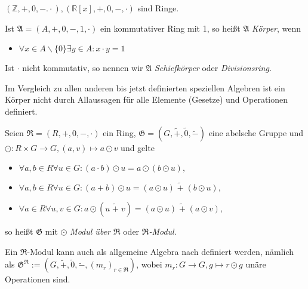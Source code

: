 \begin{example}
    $(\mathbb{Z}, +, 0, -. \cdot), (\mathbb{R}[x], +, 0, -, \cdot)$ sind Ringe.
\end{example}

\begin{samepage}
\begin{definition}
    Ist $\mathfrak{A} = (A,+,0,-,1,\cdot)$ ein kommutativer Ring mit 1, so heißt $\mathfrak{A}$ \emph{Körper}, wenn
    \begin{itemize}
        \item $\forall x \in A\backslash \{0\} \exists y \in A: x\cdot y = 1$
    \end{itemize}
    Ist $\cdot$ nicht kommutativ, so nennen wir $\mathfrak{A}$ \emph{Schiefkörper} oder \emph{Divisionsring}.
\end{definition}
\end{samepage}

\begin{remark}
    Im Vergleich zu allen anderen bis jetzt definierten speziellen Algebren ist ein Körper nicht durch Allaussagen für alle Elemente (Gesetze) und Operationen definiert. 
\end{remark}

\begin{definition}
    Seien $\mathfrak{R} = (R, +, 0, -, \cdot)$ ein Ring, $\mathfrak{G} = (G, \widetilde{+}, \widetilde{0}, \widetilde{-})$ eine abelsche Gruppe und $\odot: R \times G \to G, (a, v) \mapsto a \odot v$ und gelte
    \begin{itemize}
        \item $\forall a,b \in R \forall u \in G: (a \cdot b)\odot u = a \odot (b \odot u),$
        \item $\forall a,b \in R \forall u \in G: (a + b) \odot u = (a \odot u) \;\widetilde{+}\; (b \odot u),$
        \item $\forall a \in R \forall u,v \in G: a \odot (u \;\widetilde{+}\; v) = (a \odot u) \;\widetilde{+}\; (a \odot v),$
    \end{itemize}
    so heißt $\mathfrak{G}$ mit $\odot$ \emph{Modul über $\mathfrak{R}$} oder \emph{$\mathfrak{R}$-Modul}.

    Ein $\mathfrak{R}$-Modul kann auch als allgemeine Algebra nach  definiert werden, nämlich als $\mathfrak{G}^\mathfrak{R} := (G, \widetilde{+}, \widetilde{0}, \widetilde{-}, (m_r)_{r \in \mathfrak{R}})$, wobei $m_r: G \to G, g \mapsto r \odot g$ unäre Operationen sind.
\end{definition}

